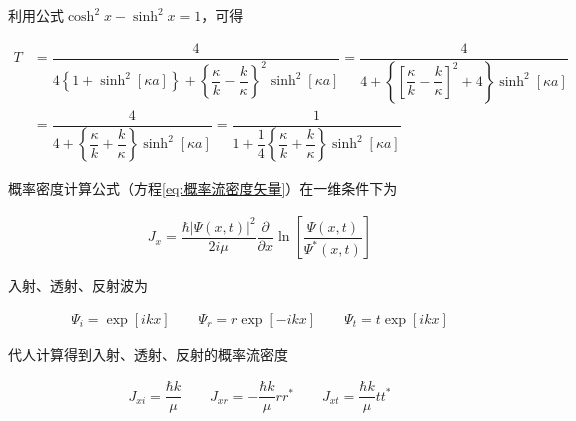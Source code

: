 利用公式$\cosh^2 x - \sinh^2 x = 1$，可得

\begin{equation*}
  \begin{aligned}
    T &= \dfrac{4}{4 \left\{ 1 + \sinh^2 \left[ \kappa a \right] \right\} + \left\{ \dfrac{\kappa}{k} - \dfrac{k}{\kappa}   \right\}^2 \sinh^2 \left[ \kappa a \right]} = \dfrac{4}{4 + \left\{ \left[ \dfrac{\kappa}{k} - \dfrac{k}{\kappa}   \right]^2 + 4 \right\} \sinh^2 \left[ \kappa a \right]} \\
    &= \dfrac{4}{4 + \left\{ \dfrac{\kappa}{k} + \dfrac{k}{\kappa}   \right\} \sinh^2 \left[ \kappa a \right]} = \dfrac{1}{1 + \dfrac{1}{4} \left\{ \dfrac{\kappa}{k} + \dfrac{k}{\kappa}   \right\} \sinh^2 \left[ \kappa a \right] }  
  \end{aligned}
\end{equation*}

概率密度计算公式（方程\ref{eq:概率流密度矢量}）在一维条件下为

\begin{equation*}
  \begin{aligned}
    J_x = \dfrac{\hbar \left| \Psi \left( x,t \right) \right|^2}{2i\mu} \dfrac{\partial}{\partial x} \ln \left[ \dfrac{\Psi \left( x,t \right)}{\Psi^{*} \left( x,t \right)}  \right]  
  \end{aligned}
\end{equation*}

入射、透射、反射波为

\begin{equation*}
  \begin{aligned}
    \Psi_i = \exp \left[ ikx \right] \quad\quad 
    \Psi_r = r \exp \left[ -ikx \right] \quad\quad 
    \Psi_t = t \exp \left[ ikx \right]
  \end{aligned}
\end{equation*}

代人计算得到入射、透射、反射的概率流密度

\begin{equation*}
  \begin{aligned}
    J_{xi} = \dfrac{\hbar k}{\mu} \quad\quad J_{xr} = - \dfrac{\hbar k}{\mu} rr^{*} \quad\quad J_{xt} = \dfrac{\hbar k}{\mu} tt^{*}   
  \end{aligned}
\end{equation*}

